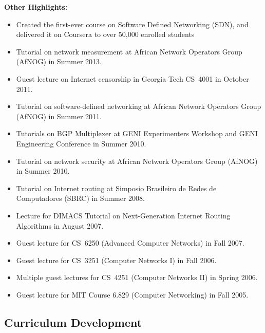 \documentclass{article}
\begin{document}
\begin{cv}{}
\noindent
{\bf Other Highlights:}
\begin{itemize}
\itemsep=-1pt
\item Created the first-ever course on Software Defined Networking (SDN), and
delivered it on Coursera to over 50,000 enrolled students 
\item Tutorial on network measurement at African Network Operators Group
(AfNOG) in Summer 2013. 
\item Guest lecture on Internet censorship in Georgia Tech CS~4001 in October
2011. 
\item Tutorial on software-defined networking at African Network Operators
Group (AfNOG) in Summer 2011. 
\item Tutorials on BGP Multiplexer at GENI Experimenters Workshop and
  GENI Engineering Conference in Summer 2010. 
\item Tutorial on network security at African Network Operators Group (AfNOG)
in Summer 2010.
\item Tutorial on Internet routing at Simposio Brasileiro de Redes de Computadores (SBRC) in Summer 2008. 
\item Lecture for DIMACS Tutorial on Next-Generation Internet Routing
  Algorithms in August 2007. 
\item Guest lecture for CS~6250 (Advanced Computer Networks) in Fall 2007. 
\item Guest lecture for CS~3251 (Computer Networks I) in Fall 2006. 
\item Multiple guest lectures for CS~4251 (Computer Networks II) in Spring
2006.
\item Guest lecture for MIT Course 6.829 (Computer Networking) in Fall
  2005. 
\end{itemize}


\subsection*{Curriculum Development}
\label{subsec:curriculum}


\end{cv}
\end{document}
